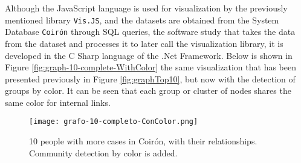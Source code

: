 Although the JavaScript language is used for visualization by the previously mentioned library \texttt{Vis.JS}, and the datasets are obtained from the System Database \texttt{Coirón} through SQL queries, the software study that takes the data from the dataset and processes it to later call the visualization library, it is developed in the C Sharp language of the .Net Framework.
Below is shown in Figure \ref{fig:graph-10-complete-WithColor} the same visualization that has been presented previously in Figure \ref{fig:graphTop10}, but now with the detection of groups by color. It can be seen that each group or cluster of nodes shares the same color for internal links.



\begin{figure}
	\centering
	\texttt{[image: grafo-10-completo-ConColor.png]}
	\caption{10 people with more cases in Coirón, with their relationships. Community detection by color is added.} 
	\label{fig:grafo-10-completo-ConColor}
\end{figure}
